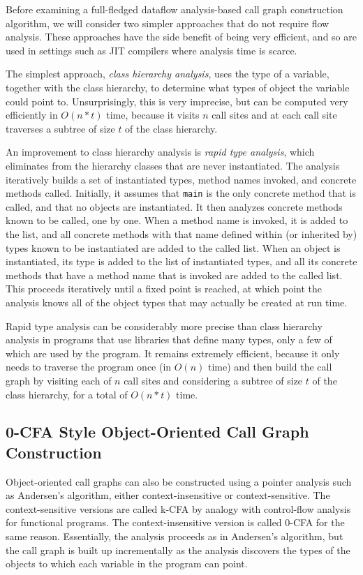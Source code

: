 \documentclass[11pt]{article}
\begin{document}
Before examining a full-fledged dataflow analysis-based call graph construction
algorithm, we will consider two simpler approaches that do not require flow
analysis. These approaches have the side benefit of being very efficient, and so
are used in settings such as JIT compilers where analysis time is scarce.

The simplest approach, \emph{class hierarchy analysis}, uses the type of a
variable, together with the class hierarchy, to determine what types of object
the variable could point to. Unsurprisingly, this is very imprecise, but can be
computed very efficiently in $O(n*t)$ time, because it visits $n$ call sites and
at each call site traverses a subtree of size $t$ of the class hierarchy.

An improvement to class hierarchy analysis is \textit{rapid type analysis},
which eliminates from the hierarchy classes that are never instantiated. The
analysis iteratively builds a set of instantiated types, method names invoked,
and concrete methods called. Initially, it assumes that \texttt{main} is the
only concrete method that is called, and that no objects are instantiated. It
then analyzes concrete methods known to be called, one by one. When a method name
is invoked, it is added to the list, and all concrete methods with that name
defined within (or inherited by) types known to be instantiated are added to the
called list. When an object is instantiated, its type is added to the list of
instantiated types, and all its concrete methods that have a method name that is
invoked are added to the called list. This proceeds iteratively until a fixed
point is reached, at which point the analysis knows all of the object types that
may actually be created at run time.

Rapid type analysis can be considerably more precise than class hierarchy
analysis in programs that use libraries that define many types, only a few of
which are used by the program. It remains extremely efficient, because it only
needs to traverse the program once (in $O(n)$ time) and then build the call
graph by visiting each of $n$ call sites and considering a subtree of size $t$
of the class hierarchy, for a total of $O(n*t)$ time.

\subsection{0-CFA Style Object-Oriented Call Graph Construction}

Object-oriented call graphs can also be constructed using a pointer analysis
such as Andersen's algorithm, either context-insensitive or context-sensitive.
The context-sensitive versions are called k-CFA by analogy with control-flow
analysis for functional programs. The context-insensitive version is called
0-CFA for the same reason. Essentially, the analysis proceeds as in Andersen's
algorithm, but the call graph is built up incrementally as the analysis
discovers the types of the objects to which each variable in the program can
point.
\end{document}
